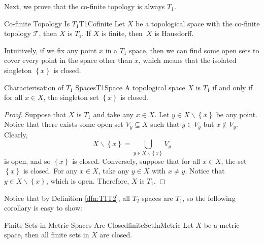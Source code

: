 \documentclass[math]{amznotes}
\theoremstyle{remark}
\begin{document}
Next, we prove that the co-finite topology is always $T_1$.
\begin{probox}{Co-finite Topology Is $T_1$}{T1Cofinite}
    Let $X$ be a topological space with the co-finite topology $\mathcal{T}$, then $X$ is $T_1$. If $X$ is finite, then~$X$ is Hausdorff.
\end{probox}
Intuitively, if we fix any point $x$ in a $T_1$ space, then we can find some open sets to cover every point in the space other than $x$, which means that the isolated singleton $\left\{x\right\}$ is closed.
\begin{probox}{Characterisation of $T_1$ Spaces}{T1Space}
    A topological space $X$ is $T_1$ if and only if for all $x \in X$, the singleton set $\left\{x\right\}$ is closed.
    \tcblower
    \begin{proof}
        Suppose that $X$ is $T_1$ and take any $x \in X$. Let $y \in X \backslash \left\{x\right\}$ be any point. Notice that there exists some open set $V_y \subseteq X$ such that $y \in V_y$ but $x \notin V_y$. Clearly, 
        \begin{equation*}
            X \backslash \left\{x\right\} = \bigcup_{y \in X \backslash \left\{x\right\}}V_y
        \end{equation*}
        is open, and so $\left\{x\right\}$ is closed. Conversely, suppose that for all $x \in X$, the set $\left\{x\right\}$ is closed. For any $x \in X$, take any $y \in X$ with $x \neq y$. Notice that $y \in X \backslash \left\{x\right\}$, which is open. Therefore, $X$ is $T_1$.
    \end{proof}
\end{probox}
Notice that by Definition \ref{dfn:T1T2}, all $T_2$ spaces are $T_1$, so the following corollary is easy to show:
\begin{corbox}{Finite Sets in Metric Spaces Are Closed}{finiteSetInMetric}
    Let $X$ be a metric space, then all finite sets in $X$ are closed.
\end{corbox}
\end{document}
